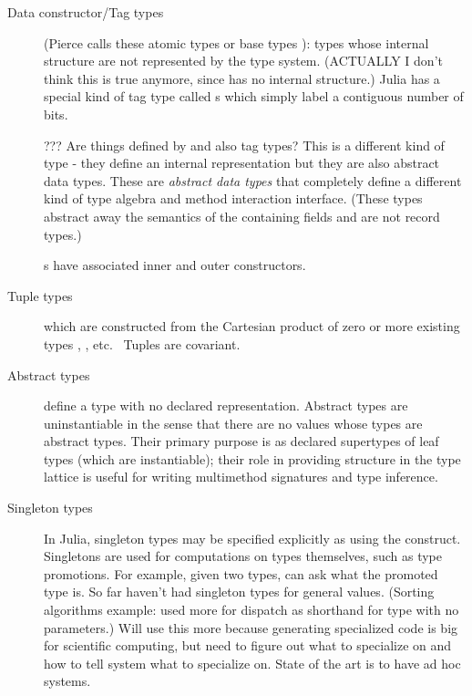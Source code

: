 \documentclass[pldi]{sigplanconf-pldi15}
\begin{document}
\begin{description}

\item[Data constructor/Tag types] (Pierce calls these atomic types or base types \cite[Fig.
	11-1, p.118]{Pierce2002}): types whose internal structure are not
	represented by the type system. (ACTUALLY I don't think this is true
	anymore, since  has no internal structure.) Julia has a
	special kind of tag type called s which simply label a
	contiguous number of bits.

??? Are things defined by  and  also tag types?
This is a different kind of type - they define an internal representation but
they are also abstract data types. These are \textit{abstract data types} that
completely define a different kind of type algebra and method interaction interface.
(These types abstract away the semantics of the containing fields and are not
record types.)

s have associated inner and outer constructors.

\item[Tuple types]  which are constructed from the Cartesian
product of zero or more existing types , , etc.~\cite[Sec. 11.7]{Pierce2002}
Tuples are covariant.

\item[Abstract types] define a type with no declared representation. Abstract
	types are uninstantiable in the sense that there are no values whose
	types are abstract types. Their primary purpose is as declared
	supertypes of leaf types (which are instantiable); their role in
	providing structure in the type lattice is useful for writing
	multimethod signatures and type inference.

\item[Singleton types] In Julia, singleton types may be specified explicitly as
	using the  construct. Singletons are used for
	computations on types themselves, such as type promotions. For example,
	given two types, can ask what the promoted type is. So far haven't had
	singleton types for general values. (Sorting algorithms example: used
	more for dispatch as shorthand for type with no parameters.) Will use
	this more because generating specialized code is big for scientific
	computing, but need to figure out what to specialize on and how to tell
	system what to specialize on. State of the art is to have ad hoc
	systems.


\end{description}
\end{document}
